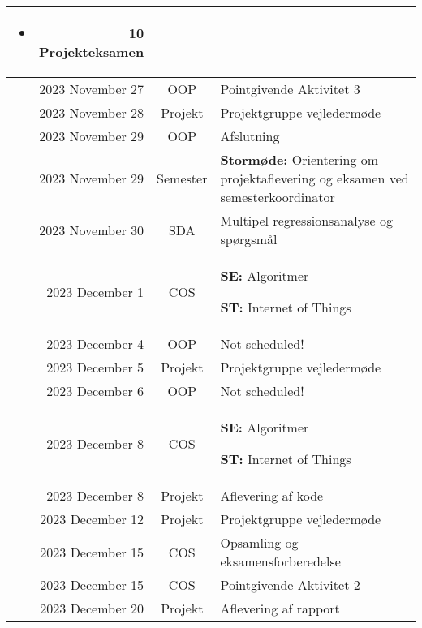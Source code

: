 \begin{longtable}{|r|c|p{}|}
\begin{itemize}[noitemsep,leftmargin=*,topsep=0pt,partopsep=0pt]
  \item 10 Projekteksamen

\end{itemize} \\
  \hline
  \rowcolor{orange}2023 November 27 & OOP & Pointgivende Aktivitet 3 \\
  \hline
  2023 November 28 & Projekt & Projektgruppe vejledermøde \\
  \hline
  2023 November 29 & OOP & Afslutning \\
  \hline
  2023 November 29 & Semester & \textbf{Stormøde:} Orientering om projektaflevering og eksamen ved semesterkoordinator \\
  \hline
  2023 November 30 & SDA & Multipel regressionsanalyse og spørgsmål \\
  \hline
  2023 December 1 & COS & \textbf{SE:} Algoritmer

\textbf{ST:} Internet of Things \\
  \hline
  2023 December 4 & OOP & Not scheduled! \\
  \hline
  2023 December 5 & Projekt & Projektgruppe vejledermøde \\
  \hline
  2023 December 6 & OOP & Not scheduled! \\
  \hline
  2023 December 8 & COS & \textbf{SE:} Algoritmer

\textbf{ST:} Internet of Things \\
  \hline
  \rowcolor{orange}2023 December 8 & Projekt & Aflevering af kode \\
  \hline
  2023 December 12 & Projekt & Projektgruppe vejledermøde \\
  \hline
  2023 December 15 & COS & Opsamling og eksamensforberedelse \\
  \hline
  \rowcolor{orange}2023 December 15 & COS & Pointgivende Aktivitet 2 \\
  \hline
  \rowcolor{orange}2023 December 20 & Projekt & Aflevering af rapport \\
  \hline
\end{longtable}
